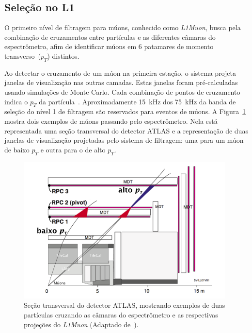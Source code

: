 \subsection{Seleção no L1}

O primeiro nível de filtragem para múons, conhecido como \emph{L1Muon}, busca
pela combinação de cruzamentos entre partículas e as diferentes câmaras do
espectrômetro, afim de identificar múons em 6 patamares de momento
transverso~($p_T$) distintos.

Ao detectar o cruzamento de um múon na primeira estação, o sistema projeta
janelas de visualização nas outras camadas. Estas janelas foram pré-calculadas
usando simulações de Monte Carlo. Cada combinação de pontos de cruzamento indica
o $p_T$ da partícula~\cite{BUTTINGER2012}. Aproximadamente 15~kHz dos 75~kHz da
banda de seleção do nível 1 de filtragem são reservados para eventos de múons. A
Figura~\ref{fig:MSMUON} mostra dois exemplos de múons passando pelo
espectrômetro. Nela está representada uma seção transversal do detector ATLAS e
a representação de duas janelas de visualização projetadas pelo sistema de
filtragem: uma para um múon de baixo $p_T$ e outra para o de alto $p_T$.


\begin{figure}[htpb!]
    \centering
    \includegraphics[width=11cm]{images/MS_transversal.png}
    \caption[Seção transversal do detector ATLAS, mostrando exemplos de duas
    partículas cruzando as câmaras do espectrômetro e as respectivas projeções
    do \emph{L1Muon}]{Seção transversal do detector ATLAS, mostrando exemplos de duas
    partículas cruzando as câmaras do espectrômetro e as respectivas projeções
    do \emph{L1Muon} (Adaptado de~\cite{BUTTINGER2012}).}
    \label{fig:MSMUON}
\end{figure}


